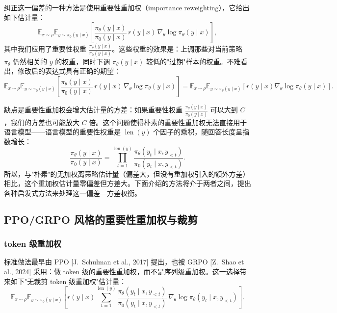 纠正这一偏差的一种方法是使用重要性重加权（importance reweighting），它给出如下估计量：
\begin{equation}
\mathbb{E}_{x\sim\rho}\mathbb{E}_{y\sim\pi_0(y \mid x)}\!\left[\frac{\pi_\theta(y \mid x)}{\pi_0(y \mid x)}\, r(y \mid x)\,\nabla_\theta \log \pi_\theta(y \mid x)\right],
\end{equation}
其中我们应用了重要性权重 $\frac{\pi_\theta(y \mid x)}{\pi_0(y \mid x)}$。这些权重的效果是：上调那些对当前策略 $\pi_\theta$ 仍然相关的 $y$ 的权重，同时下调 $\pi_\theta(y \mid x)$ 较低的"过期"样本的权重。不难看出，修改后的表达式具有正确的期望：
\begin{equation}
\mathbb{E}_{x\sim\rho}\mathbb{E}_{y\sim\pi_0(y \mid x)}\!\left[\frac{\pi_\theta(y \mid x)}{\pi_0(y \mid x)}\, r(y \mid x)\,\nabla_\theta \log \pi_\theta(y \mid x)\right] = \mathbb{E}_{x\sim\rho}\mathbb{E}_{y\sim\pi_\theta(y \mid x)}\!\left[r(y \mid x)\nabla_\theta \log \pi_\theta(y \mid x)\right].
\end{equation}

缺点是重要性重加权会增大估计量的方差：如果重要性权重 $\frac{\pi_\theta(y \mid x)}{\pi_0(y \mid x)}$ 可以大到 $C$，我们的方差也可能放大 $C$ 倍。这个问题使得朴素的重要性重加权无法直接用于语言模型——语言模型的重要性权重是 $\operatorname{len}(y)$ 个因子的乘积，随回答长度呈指数增长：
\begin{equation}
\frac{\pi_\theta(y \mid x)}{\pi_0(y \mid x)} = \prod_{t=1}^{\operatorname{len}(y)} \frac{\pi_\theta(y_t \mid x, y_{<t})}{\pi_0(y_t \mid x, y_{<t})}.
\end{equation}
所以，与"朴素"的无加权离策略估计量（偏差大，但没有重加权引入的额外方差）相比，这个重加权估计量零偏差但方差大。下面介绍的方法将介于两者之间，提出各种启发式方法来处理这一偏差—方差权衡。

\subsection{PPO/GRPO 风格的重要性重加权与裁剪}

\subsubsection{token 级重加权}

标准做法最早由 PPO [J.\ Schulman et al., 2017] 提出，也被 GRPO [Z.\ Shao et al., 2024] 采用：做 token 级的重要性重加权，而不是序列级重加权。这一选择带来如下"无裁剪 token 级重加权"估计量：
\begin{equation}
\mathbb{E}_{x\sim\rho}\mathbb{E}_{y\sim\pi_0(y \mid x)}\!\left[r(y \mid x)\sum_{t=1}^{\operatorname{len}(y)} \frac{\pi_\theta(y_t \mid x, y_{<t})}{\pi_0(y_t \mid x, y_{<t})}\,\nabla_\theta \log \pi_\theta(y_t \mid x, y_{<t})\right].
\end{equation}

